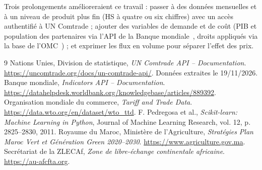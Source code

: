 \documentclass[11pt,a4paper]{article}
\begin{document}
Trois prolongements amélioreraient ce travail : passer à des données mensuelles et à un niveau de produit plus fin (HS à quatre ou six chiffres) avec un accès authentifié à UN Comtrade ; ajouter des variables de demande et de coût (PIB et population des partenaires via l'API de la Banque mondiale~\cite{worldbank}, droits appliqués via la base de l'OMC~\cite{wto}) ; et exprimer les flux en volume pour séparer l'effet des prix.

\begin{thebibliography}{9}
 Nations Unies, Division de statistique, \emph{UN Comtrade API -- Documentation}. \url{https://uncomtrade.org/docs/un-comtrade-api/}. Données extraites le 19/11/2026.
 Banque mondiale, \emph{Indicators API -- Documentation}. \url{https://datahelpdesk.worldbank.org/knowledgebase/articles/889392}.
 Organisation mondiale du commerce, \emph{Tariff and Trade Data}. \url{https://data.wto.org/en/dataset/wto_ttd}.
 F. Pedregosa et al., \emph{Scikit-learn: Machine Learning in Python}, Journal of Machine Learning Research, vol. 12, p. 2825--2830, 2011.
 Royaume du Maroc, Ministère de l'Agriculture, \emph{Stratégies Plan Maroc Vert et Génération Green 2020--2030}. \url{https://www.agriculture.gov.ma}.
 Secrétariat de la ZLECAf, \emph{Zone de libre-échange continentale africaine}. \url{https://au-afcfta.org}.
\end{thebibliography}

\appendix
\end{document}
